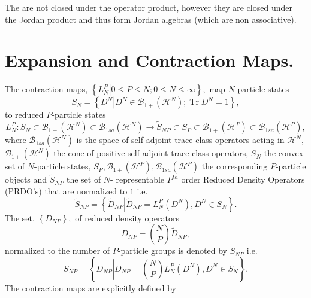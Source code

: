 \documentclass[aps,preprint]{revtex4}%
\begin{document}
The are not closed under the operator product, however they are closed under
the Jordan product and thus form Jordan algebras (which are non associative).

\section{Expansion and Contraction Maps.}

The contraction maps, $\left\{  \left.  L_{N}^{P}\right\vert 0\leq P\leq
N;0\leq N\leq\infty\right\}  ,$ map $N$-particle states%
\begin{equation}
S_{N}=\left\{  D^{N}\left\vert D^{N}\in\mathcal{B}_{1+}\left(  \mathcal{H}%
^{N}\right)  ;\operatorname{Tr}D^{N}=1\right.  \right\}  ,
\end{equation}
to reduced $P$-particle states
\begin{equation}
L_{N}^{P}:S_{N}\subset\mathcal{B}_{1+}\left(  \mathcal{H}^{N}\right)
\subset\mathcal{B}_{1sa}\left(  \mathcal{H}^{N}\right)  \longrightarrow
\tilde{S}_{NP}\subset S_{P}\subset\mathcal{B}_{1+}\left(  \mathcal{H}%
^{P}\right)  \subset\mathcal{B}_{1sa}\left(  \mathcal{H}^{P}\right)  ,
\end{equation}
where $\mathcal{B}_{1sa}\left(  \mathcal{H}^{N}\right)  $ is the space of self
adjoint trace class operators acting in $\mathcal{H}^{N},$ $\mathcal{B}%
_{1+}\left(  \mathcal{H}^{N}\right)  $ the cone of positive self adjoint trace
class operators, $S_{N}$ the convex set of $N$-particle states, $S_{P}%
,\mathcal{B}_{1+}\left(  \mathcal{H}^{P}\right)  ,\mathcal{B}_{1sa}\left(
\mathcal{H}^{P}\right)  $ the corresponding $P$-particle objects and
$\tilde{S}_{NP}$ the set of $N$- representable $P^{th}$ order Reduced Density
Operators (PRDO's) that are normalized to $1$ i.e.
\begin{equation}
\tilde{S}_{NP}=\left\{  \left.  \tilde{D}_{NP}\right\vert \tilde{D}_{NP}%
=L_{N}^{P}\left(  D^{N}\right)  ,D^{N}\in S_{N}\right\}  .
\end{equation}
The set, $\left\{  D_{NP}\right\}  ,$ of reduced density operators
\begin{equation}
D_{NP}=\binom{N}{P}\tilde{D}_{NP},
\end{equation}
normalized to the number of $P$-particle groups is denoted by $S_{NP}$ i.e.
\begin{equation}
S_{NP}=\left\{  D_{NP}\left\vert D_{NP}=\binom{N}{P}L_{N}^{P}\left(
D^{N}\right)  ,D^{N}\in S_{N}\right.  \right\}  .
\end{equation}
The contraction maps are explicitly defined by
\end{document}
